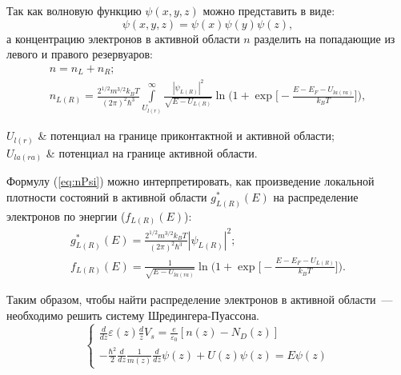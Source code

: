Так как волновую функцию $\psi(x, y,z )$ можно представить в виде:
\begin{equation}
	\psi(x, y, z) = \psi(x)\psi(y)\psi(z),
\end{equation}
а концентрацию электронов в активной области $n$ разделить на попадающие из левого и правого резервуаров:
\begin{gather}
	n = n_{L} + n_{R};\\
	\label{eq:nPsi}
	n_{L(R)} = \frac{2^{1/2}m^{3/2}k_{B}T}{(2\pi)^{2}\hbar^{3}}\int\limits_{U_{l(r)}}^{\infty} \frac{|\psi_{L(R)}|^{2}}{\sqrt{E - U_{L(R)}}} \ln \bigg( 1 + \exp\bigg[ -\frac{E - E_{F} - U_{la(ra)}}{k_{B}T} \bigg] \bigg),
\end{gather}
\begin{conditions}
	$U_{l(r)}$ & потенциал на границе приконтактной и активной области;\\
	$U_{la(ra)}$ & потенциал на границе активной области.
\end{conditions}
Формулу (\ref{eq:nPsi}) можно интерпретировать, как произведение локальной плотности состояний в активной области $g^{*}_{L(R)}(E)$ на распределение электронов по энергии ($f_{L(R)}(E)$):
\begin{gather}
	g^{*}_{L(R)}(E) = \frac{2^{1/2}m^{3/2}k_{B}T}{(2\pi)^{2}\hbar^{3}}|\psi_{L(R)}|^{2};\\
	f_{L(R)}(E) =  \frac{1}{\sqrt{E - U_{la(ra)}}} \ln \bigg( 1 + \exp\bigg[ -\frac{E - E_{F} - U_{L(R)}}{k_{B}T} \bigg] \bigg).
\end{gather}

Таким образом, чтобы найти распределение электронов в активной области~--- необходимо решить систему Шредингера-Пуассона.
\begin{equation}
	\label{eq:P-S}
	\begin{cases}
		\frac{d}{dz}\varepsilon(z)\frac{d}{z}V_{s} = \frac{e}{\varepsilon_{0}}[n(z) - N_{D}(z)]\\
		-\frac{\hbar^{2}}{2}\frac{d}{dz}\frac{1}{m(z)}\frac{d}{dz}\psi(z) + U(z)\psi(z) = E\psi(z)
	\end{cases}
\end{equation}

